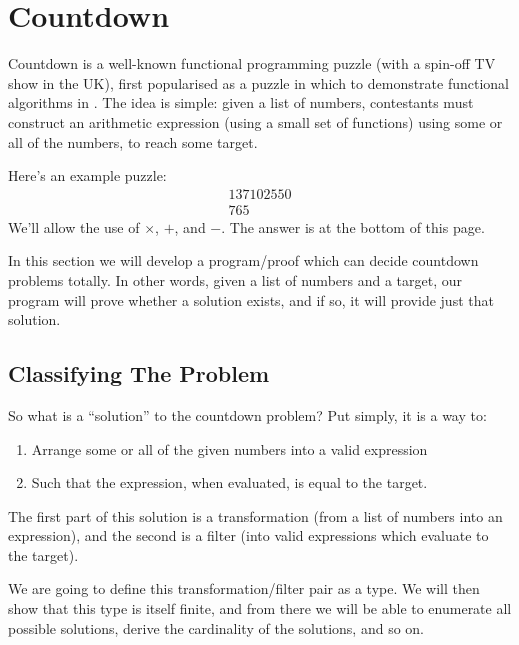 \chapter{Countdown}
Countdown is a well-known functional programming puzzle (with a spin-off TV show
in the UK), first popularised as a puzzle in which to demonstrate functional
algorithms in \cite{huttonCountdownProblem2002}.
The idea is simple: given a list of numbers, contestants must construct an
arithmetic expression (using a small set of functions) using some or all of the
numbers, to reach some target.

Here's an example puzzle:
\begin{gather*}
  \boxed{1} \boxed{3} \boxed{7} \boxed{10} \boxed{25} \boxed{50} \\
  \boxed{765} \tag{Target}
\end{gather*}
We'll allow the use of \(\times\), \(+\), and \(-\).
The answer is at the bottom of this page\footnotemark.


In this section we will develop a program/proof which can decide countdown
problems totally.
In other words, given a list of numbers and a target, our program will prove
whether a solution exists, and if so, it will provide just that solution.
\section{Classifying The Problem}
So what is a ``solution'' to the countdown problem?
Put simply, it is a way to:
\begin{enumerate}
  \item Arrange some or all of the given numbers into a valid expression
  \item Such that the expression, when evaluated, is equal to the target.
\end{enumerate}
The first part of this solution is a transformation (from a list of numbers into
an expression), and the second is a filter (into valid expressions which
evaluate to the target).

We are going to define this transformation/filter pair as a type.
We will then show that this type is itself finite, and from there we will be
able to enumerate all possible solutions, derive the cardinality of the
solutions, and so on.



